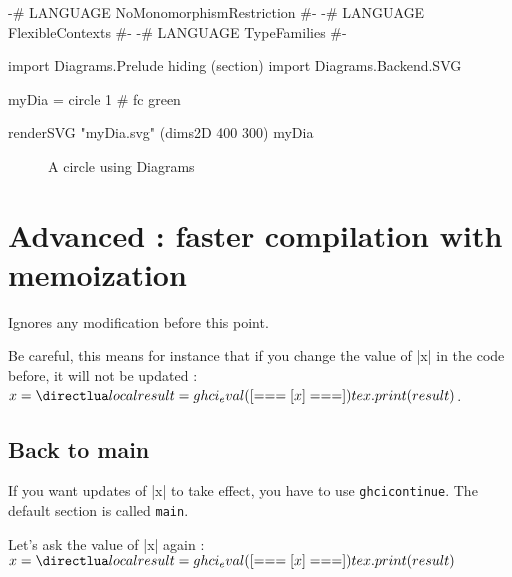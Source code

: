 \documentclass{article}
\begin{document}
\begin{ghci}
{-# LANGUAGE NoMonomorphismRestriction #-}
{-# LANGUAGE FlexibleContexts          #-}
{-# LANGUAGE TypeFamilies              #-}

import Diagrams.Prelude hiding (section)
import Diagrams.Backend.SVG

myDia = circle 1 # fc green
\end{ghci}

\begin{ghci}
  renderSVG "myDia.svg" (dims2D 400 300) myDia
\end{ghci}

\begin{figure}[h]
  \centering
  
  \caption{A circle using Diagrams}
\end{figure}


\section{Advanced : faster compilation with memoization}

Ignores any modification before this point.

Be careful, this means for instance that if you change the value of |x| in the code before, it will not be updated : $x = \hask{x}$.


\subsection{Back to main}
If you  want updates of |x| to take effect, you have to use \texttt{ghcicontinue}. The default section is called \texttt{main}.

Let's ask the value of |x| again : $x = \hask{x}$
\end{document}
